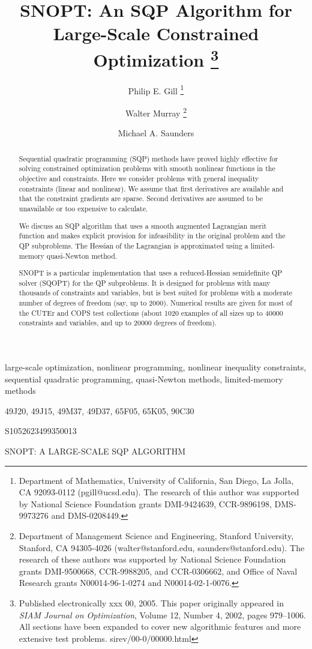 \documentclass[draft,leqno,onefignum,onetabnum]{siamltex}
\title{SNOPT: An SQP Algorithm for Large-Scale Constrained Optimization%
   \thanks{%
           Published electronically xxx 00, 2005.
           This paper originally appeared in
           \emph{SIAM Journal on Optimization}, Volume 12,
           Number 4, 2002, pages 979--1006.
           All sections have been expanded to cover
           new algorithmic features and more extensive test problems.
           \URL sirev/00-0/00000.html}}
\author{Philip E. Gill%
   \thanks{Department of Mathematics, University of California,
           San Diego, La Jolla, CA 92093-0112
           (pgill@ucsd.edu).
           The research of this author was supported by
           National Science Foundation grants
           DMI-9424639, CCR-9896198, DMS-9973276 and DMS-0208449.}
   \and Walter Murray%
   \thanks{Department of Management Science and Engineering,
           Stanford University, Stanford, CA 94305-4026
           (walter@stanford.edu, saunders@stanford.edu).
           The research of these authors was supported by
           National Science Foundation grants
           DMI-9500668, CCR-9988205, and CCR-0306662, and
           Office of Naval Research grants
           N00014-96-1-0274 and N00014-02-1-0076.}
   \and Michael A. Saunders\footnotemark[3]}
\begin{document}
\maketitle
\vspace{-1.2in}
\vspace{.9in}

\setcounter{page}{1}

\begin{abstract}
Sequential quadratic programming (SQP) methods have proved highly
effective for solving constrained optimization problems with smooth
nonlinear functions in the objective and constraints.  Here we
consider problems with general inequality constraints (linear and
nonlinear).  We assume that first derivatives  are available and that
the constraint gradients are sparse.  Second derivatives are
assumed to be unavailable or too expensive to calculate.

We discuss an SQP algorithm that uses a smooth augmented Lagrangian
merit function and makes explicit provision for infeasibility in the
original problem and the QP subproblems.  The Hessian of the
Lagrangian is approximated using a limited-memory quasi-Newton method.

SNOPT is a particular implementation that uses a reduced-Hessian
semidefinite QP solver (SQOPT) for the QP subproblems. It
is designed for problems with many thousands of constraints and
variables, but is best suited for problems with a moderate number of
degrees of freedom (say, up to 2000).
Numerical results are given for most of the
CUTEr and COPS test collections (about 1020 examples of all
sizes up to 40000 constraints and variables,
and up to 20000 degrees of freedom).
\end{abstract}

\begin{keywords}
          large-scale optimization, nonlinear programming,
          nonlinear inequality constraints,
          sequential quadratic programming, quasi-Newton methods,
          limited-memory methods
\end{keywords}

\begin{AMS}
   49J20, 49J15, 49M37, 49D37, 65F05, 65K05, 90C30
\end{AMS}

\begin{PII}
S1052623499350013
\end{PII}

\pagestyle{myheadings}
\thispagestyle{plain}
         {SNOPT: A LARGE-SCALE SQP ALGORITHM}
\end{document}
